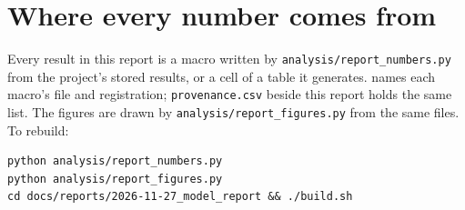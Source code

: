 \documentclass[11pt,a4paper]{article}
\begin{document}
\section{Where every number comes from}
Every result in this report is a macro written by \texttt{analysis/report\_numbers.py} from the
project's stored results, or a cell of a table it generates.  names each
macro's file and registration; \texttt{provenance.csv} beside this report holds the same list. The
figures are drawn by \texttt{analysis/report\_figures.py} from the same files. To rebuild:
\begin{verbatim}
python analysis/report_numbers.py
python analysis/report_figures.py
cd docs/reports/2026-11-27_model_report && ./build.sh
\end{verbatim}

{\footnotesize\setlength{\tabcolsep}{3pt}
\renewcommand{\longcap}{Every macro, its value, its file and its registration or meaning.\label{tab:provenance}}

}
\fi



\end{document}
